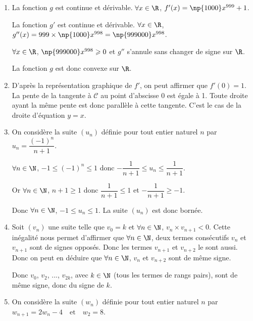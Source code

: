 \medskip

\begin{enumerate}
	\item La fonction $g$ est continue et dérivable. $\forall x \in \R$, $f'(x)=\np{1000}x^{999}+1$.
	
La fonction $g'$ est continue et dérivable. $\forall x \in \R$, $g''(x)=999\times \np{1000}x^{998}=\np{999000}x^{998}$.
	
	$\forall x \in \R$, $\np{999000}x^{998}\geqslant 0$ et $g''$ s'annule sans changer de signe sur $\R$.
	
La fonction $g$ est donc convexe sur $\R$. \hfill {}
	\item D'après la représentation graphique de $f'$, on peut affirmer que $f'(0)=1$. La pente de la tangente à $\mathcal{C}$ au point d'abscisse 0 est égale à 1. Toute droite ayant la même pente est donc parallèle à cette tangente. C'est le cas de la droite d'équation $y=x$. 
	
\hfill {}
	\item On considère la suite $\left(u_n\right)$ définie pour tout entier naturel $n$ par $u_n = \dfrac{(-1)^n}{n+1}$.
	
$\forall n \in \N$, $ -1\leqslant (-1)^n \leqslant 1$ donc $-\dfrac{1}{n+1} \leqslant u_n \leqslant \dfrac{1}{n+1}$.
	
Or $\forall n \in \N$, $n+1\geqslant 1$ donc $\dfrac{1}{n+1} \leqslant 1$ et $-\dfrac{1}{n+1} \geqslant -1$.
	
Donc  $\forall n \in \N$, $-1\leqslant u_n \leqslant 1$. La suite $(u_n)$ est donc bornée.
	
\hfill {}
	\item Soit $\left(v_n\right)$ une suite telle que $v_0 = k$ et $\forall n \in \N$, $v_n\times v_{n+1}<0$. Cette inégalité nous permet d'affirmer que $\forall n \in \N$,  deux termes consécutifs $v_n$ et $v_{n+1}$ sont de signes opposés. Donc les termes  $v_{n+1}$ et  $v_{n+2}$ le sont aussi. Donc on peut en déduire que $\forall n \in \N$, $v_n$ et $v_{n+2}$  sont de même signe.
	
Donc $v_0$, $v_2$, ..., $v_{2k}$, \: avec $k\in \N$ (tous les termes de rangs pairs), sont de même signe, donc du signe de $k$.
	
\hfill {}
	\item On considère la suite $\left(w_n\right)$ définie pour tout entier naturel $n$ par $w_{n+1} = 2w_n - 4\quad \text{et}\quad  w_2 = 8$.
	

\end{enumerate}
